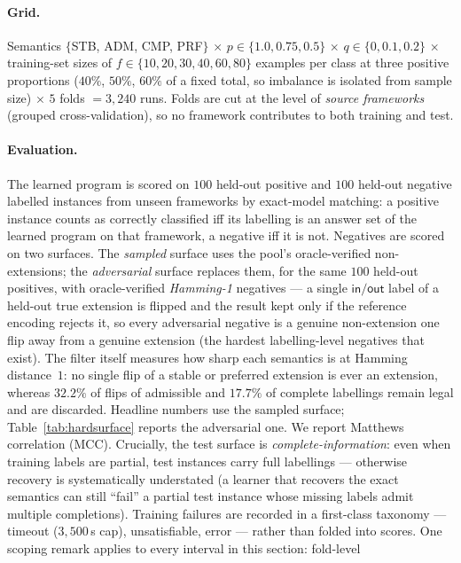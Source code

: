 \documentclass[review,12pt]{elsarticle}
\theoremstyle{definition}
\theoremstyle{remark}
\newcommand{\pred}[1]{\textsf{#1}}
\begin{document}
\paragraph{Grid.} Semantics $\{$STB, ADM, CMP, PRF$\}$ $\times$
$p\in\{1.0,0.75,0.5\}$ $\times$ $q\in\{0,0.1,0.2\}$ $\times$ training-set
sizes of $f\in\{10,20,30,40,60,80\}$ examples per class at three positive
proportions ($40\%$, $50\%$, $60\%$ of a fixed total, so imbalance is isolated
from sample size) $\times$ $5$ folds $=3{,}240$ runs. Folds are cut at the
level of \emph{source frameworks} (grouped cross-validation), so no framework
contributes to both training and test.

\paragraph{Evaluation.} The learned program is scored on $100$ held-out
positive and $100$ held-out negative labelled instances from unseen frameworks
by exact-model matching: a positive instance counts as correctly classified iff
its labelling is an answer set of the learned program on that framework, a
negative iff it is not. Negatives are scored on two surfaces. The
\emph{sampled} surface uses the pool's oracle-verified non-extensions; the
\emph{adversarial} surface replaces them, for the same $100$ held-out
positives, with oracle-verified \emph{Hamming-1} negatives --- a single
$\pred{in}/\pred{out}$ label of a held-out true extension is flipped and the
result kept only if the reference encoding rejects it, so every adversarial
negative is a genuine non-extension one flip away from a genuine extension
(the hardest labelling-level negatives that exist). The filter itself
measures how sharp each semantics is at Hamming distance~$1$: no single flip
of a stable or preferred extension is ever an extension, whereas $32.2\%$ of
flips of admissible and $17.7\%$ of complete labellings remain legal and are
discarded. Headline numbers use the sampled surface;
Table~\ref{tab:hardsurface} reports the adversarial one. We report Matthews
correlation (MCC). Crucially, the
test surface is \emph{complete-information}: even when training labels are
partial, test instances carry full labellings --- otherwise recovery is
systematically understated (a learner that recovers the exact semantics can
still ``fail'' a partial test instance whose missing labels admit multiple
completions). Training failures are recorded in a first-class taxonomy ---
timeout ($3{,}500$\,s cap), unsatisfiable, error --- rather than folded into
scores. One scoping remark applies to every interval in this section: fold-level
\end{document}
